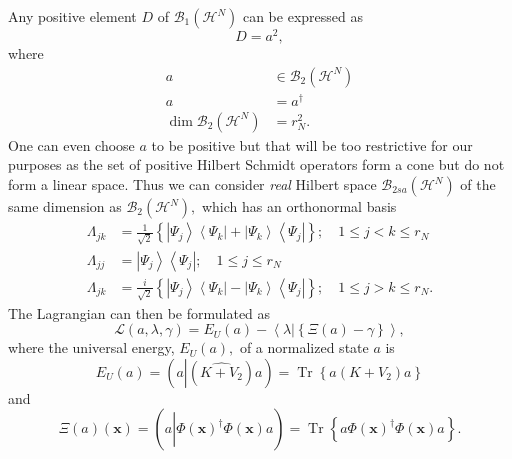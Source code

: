 \documentclass[aps,preprint]{revtex4}%
\begin{document}
Any positive element $D$ of $\mathcal{B}_{1}\left(  \mathcal{H}^{N}\right)  $
can be expressed as
\begin{equation}
D=a^{2},
\end{equation}
where
\begin{align}
a  &  \in\mathcal{B}_{2}\left(  \mathcal{H}^{N}\right) \nonumber\\
a  &  =a^{\dagger}\nonumber\\
\dim\mathcal{B}_{2}\left(  \mathcal{H}^{N}\right)   &  =r_{N}^{2}.
\end{align}
One can even choose $a$ to be positive but that will be too restrictive for
our purposes as the set of positive Hilbert Schmidt operators form a cone but
do not form a linear space. Thus we can consider \emph{real} Hilbert space
$\mathcal{B}_{2sa}\left(  \mathcal{H}^{N}\right)  $ of the same dimension as
$\mathcal{B}_{2}\left(  \mathcal{H}^{N}\right)  ,$ which has an orthonormal
basis
\begin{align}
\Lambda_{jk}  &  =\frac{1}{\sqrt{2}}\left\{  \left\vert \Psi_{j}\right\rangle
\left\langle \Psi_{k}\right\vert +\left\vert \Psi_{k}\right\rangle
\left\langle \Psi_{j}\right\vert \right\}  ;\quad1\leq j<k\leq r_{N}%
\nonumber\\
\Lambda_{jj}  &  =\left\vert \Psi_{j}\right\rangle \left\langle \Psi
_{j}\right\vert ;\quad1\leq j\leq r_{N}\nonumber\\
\Lambda_{jk}  &  =\frac{i}{\sqrt{2}}\left\{  \left\vert \Psi_{j}\right\rangle
\left\langle \Psi_{k}\right\vert -\left\vert \Psi_{k}\right\rangle
\left\langle \Psi_{j}\right\vert \right\}  ;\quad1\leq j>k\leq r_{N}.
\end{align}
The Lagrangian can then be formulated as
\begin{equation}
\mathcal{L}\left(  a,\lambda,\gamma\right)  =E_{U}\left(  a\right)
-\left\langle \lambda\left\vert \left\{  \Xi\left(  a\right)  -\gamma\right\}
\right.  \right\rangle ,
\end{equation}
where the universal energy, $E_{U}\left(  a\right)  ,$ of a normalized state
$a$ is
\begin{equation}
E_{U}\left(  a\right)  =\left(  a\left\vert \left(  \widehat{K+V_{2}}\right)
\right.  a\right)  =\operatorname{Tr}\left\{  a\left(  K+V_{2}\right)
a\right\}
\end{equation}
and
\begin{equation}
\Xi\left(  a\right)  \left(  \mathbf{x}\right)  =\left(  a\left\vert
\widehat{\Phi\left(  \mathbf{x}\right)  ^{\dagger}\Phi\left(  \mathbf{x}%
\right)  }\right.  a\right)  =\operatorname{Tr}\left\{  a\Phi\left(
\mathbf{x}\right)  ^{\dagger}\Phi\left(  \mathbf{x}\right)  a\right\}  .
\end{equation}
\end{document}
